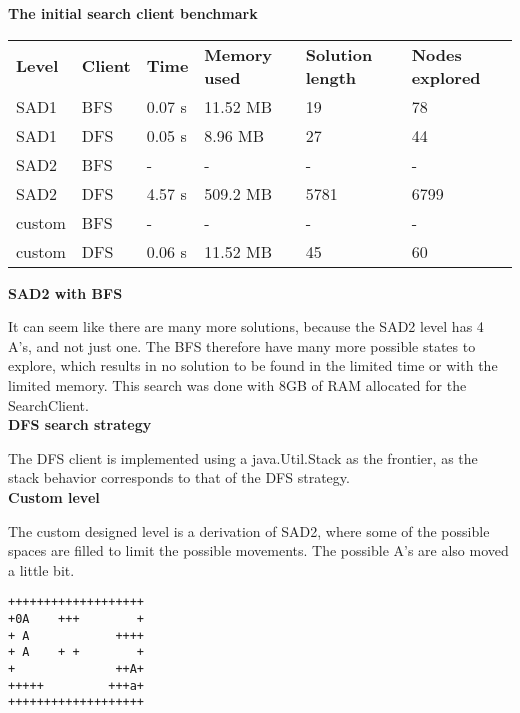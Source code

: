 \documentclass[Main]{subfiles}
\begin{document}
\textbf{The initial search client benchmark}

\begin{table}[h]
\begin{tabular}{llllll}
\rowcolor[HTML]{EFEFEF} 
\textbf{Level} & \textbf{Client} & \textbf{Time} & \textbf{Memory used} & \textbf{Solution length} & \textbf{Nodes explored} \\
SAD1           & BFS             & 0.07 s        & 11.52 MB             & 19                       & 78                      \\
SAD1           & DFS             & 0.05 s        & 8.96 MB              & 27                       & 44                      \\
SAD2           & BFS             & -           & -                  & -                      & -                     \\
SAD2           & DFS             & 4.57 s        & 509.2 MB             & 5781                     & 6799                    \\
custom         & BFS             & -           & -                  & -                      & -                     \\
custom         & DFS             & 0.06 s        & 11.52 MB             & 45                       & 60                     
\end{tabular}
\end{table}


\textbf{SAD2 with BFS} 

It can seem like there are many more solutions, because the SAD2 level has 4 A's, and not just one. The BFS therefore have many more possible states to explore, which results in no solution to be found in the limited time or with the limited memory. This search was done with 8GB of RAM allocated for the SearchClient.
\\

\textbf{DFS search strategy}

The DFS client is implemented using a java.Util.Stack as the frontier, as the stack behavior corresponds to that of the DFS strategy. 
\\

\textbf{Custom level}

The custom designed level is a derivation of SAD2, where some of the possible spaces are filled to limit the possible movements. The possible A's are also moved a little bit. 

\begin{verbatim}
+++++++++++++++++++
+0A    +++        +
+ A            ++++
+ A    + +        +
+              ++A+
+++++         +++a+
+++++++++++++++++++
\end{verbatim}
\end{document}
